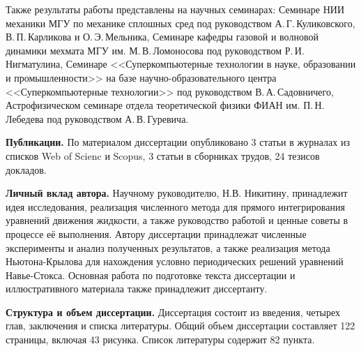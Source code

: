 Также результаты работы представлены на научных семинарах: 
Семинаре НИИ механики МГУ по механике сплошных сред под руководством А.\,Г.\,Куликовского, В.\,П.\,Карликова и О.\,Э.\,Мельника, 
Семинаре кафедры газовой и волновой динамики мехмата МГУ им. М.\,В.\,Ломоносова под руководством Р.\,И.\,Нигматулина,
Семинаре <<Суперкомпьютерные технологии в науке, образовании и промышленности>> на базе научно-образовательного центра <<Суперкомпьютерные технологии>> под руководством В.\,А.\,Садовничего,
Астрофизическом семинаре отдела теоретической физики ФИАН им. П.\,Н.\,Лебедева под руководством А.\,В.\,Гуревича.



\textbf{Публикации.} 
По материалом диссертации опубликовано 3 статьи в журналах из списков Web of Scienc и Scopus, 
3 статьи в сборниках трудов, 
24 тезисов докладов.

{\bf Личный вклад автора.} 
Научному руководителю, Н.В. Никитину, принадлежит идея исследования, реализация численного метода для прямого интегрирования уравнений движения жидкости, а также руководство работой и ценные советы в процессе её выполнения. Автору диссертации принадлежат численные эксперименты и анализ полученных результатов, а также реализация метода Ньютона-Крылова для нахождения условно периодических решений уравнений Навье-Стокса. Основная работа по подготовке текста диссертации и иллюстративного материала также принадлежит диссертанту. 

{\bf Структура и объем диссертации.} 
Диссертация состоит из введения, четырех глав, заключения и списка литературы. Общий объем диссертации составляет 122 страницы, включая 43 рисунка. Список литературы содержит 82 пункта. 




